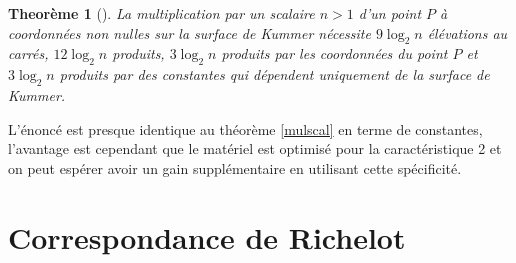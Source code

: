 \documentclass[a4paper,12pt]{article}
\newtheorem{theoreme}{Theorème}[section]
\theoremstyle{definition}
\theoremstyle{remark}
\numberwithin{equation}{section}
\begin{document}
\begin{theoreme}[\citep{lubicz}]
La multiplication par un scalaire $n > 1$ d'un point $P$ à coordonnées non nulles sur la surface de Kummer nécessite $9\log_2 n$ élévations au carrés, $12\log_2 n$ produits, $3\log_2 n$ produits par les coordonnées du point $P$ et $3\log_2 n$ produits par des constantes qui dépendent uniquement de la surface de Kummer.
\end{theoreme}

L'énoncé est presque identique au théorème \ref{mulscal} en terme de constantes, l'avantage est cependant que le matériel est optimisé pour la caractéristique 2 et on peut espérer avoir un gain supplémentaire en utilisant cette spécificité.




\appendix

\section{Correspondance de Richelot}
\end{document}
